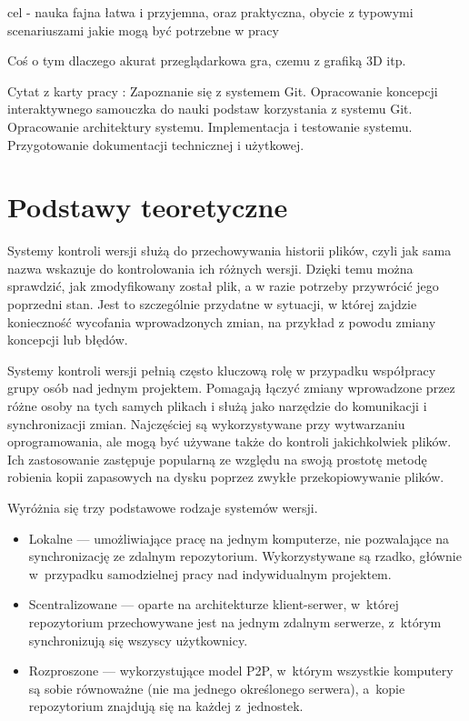 \documentclass[11pt,a4paper,polish,thesis]{dcsbook}
\begin{document}
	cel - nauka fajna łatwa i przyjemna, oraz praktyczna, obycie z typowymi scenariuszami jakie mogą być potrzebne w pracy
	
	Coś o tym dlaczego akurat przeglądarkowa gra, czemu z grafiką 3D itp.
	
	Cytat z karty pracy : Zapoznanie się z systemem Git. Opracowanie koncepcji interaktywnego samouczka do nauki podstaw korzystania z systemu Git.  Opracowanie architektury systemu. Implementacja i testowanie systemu. Przygotowanie dokumentacji technicznej i użytkowej.
	
	\chapter{Podstawy teoretyczne}

	Systemy kontroli wersji służą do przechowywania historii plików, czyli jak sama nazwa wskazuje do kontrolowania ich różnych wersji. Dzięki temu można sprawdzić, jak zmodyfikowany został plik, a w razie potrzeby przywrócić jego poprzedni stan. Jest to szczególnie przydatne w sytuacji, w której zajdzie konieczność wycofania wprowadzonych zmian, na przykład z powodu zmiany koncepcji lub błędów.

	Systemy kontroli wersji pełnią często kluczową rolę w przypadku współpracy grupy osób nad jednym projektem. Pomagają łączyć zmiany wprowadzone przez różne osoby na tych samych plikach i służą jako narzędzie do komunikacji i synchronizacji zmian. Najczęściej są wykorzystywane przy wytwarzaniu oprogramowania, ale mogą być używane także do kontroli jakichkolwiek plików. Ich zastosowanie zastępuje popularną ze względu na swoją prostotę metodę robienia kopii zapasowych na dysku poprzez zwykłe przekopiowywanie plików.

	Wyróżnia się trzy podstawowe rodzaje systemów wersji.
	\begin{itemize}
		\item Lokalne --- umożliwiające pracę na jednym komputerze, nie pozwalające na synchronizację ze zdalnym repozytorium. Wykorzystywane są rzadko, głównie w~przypadku samodzielnej pracy nad indywidualnym projektem.
		\item Scentralizowane --- oparte na architekturze klient-serwer, w~której repozytorium przechowywane jest na jednym zdalnym serwerze, z~którym synchronizują się wszyscy użytkownicy.
		\item Rozproszone --- wykorzystujące model P2P, w~którym wszystkie komputery są sobie równoważne (nie ma jednego określonego serwera), a~kopie repozytorium znajdują się na każdej z~jednostek.
	\end{itemize}
\end{document}
